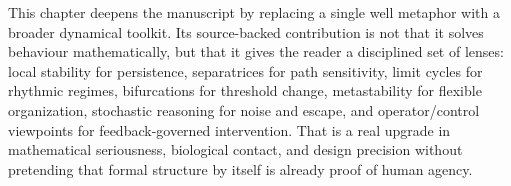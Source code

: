 \begin{summarybox}
This chapter deepens the manuscript by replacing a single well metaphor with a
broader dynamical toolkit. Its source-backed contribution is not that it
solves behaviour mathematically, but that it gives the reader a disciplined set
of lenses: local stability for persistence, separatrices for path sensitivity,
limit cycles for rhythmic regimes, bifurcations for threshold change,
metastability for flexible organization, stochastic reasoning for noise and
escape, and operator/control viewpoints for feedback-governed intervention.
That is a real upgrade in mathematical seriousness, biological contact, and
design precision without pretending that formal structure by itself is already
proof of human agency.
\end{summarybox}
